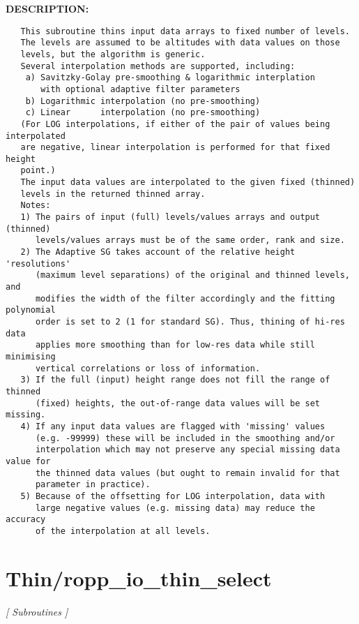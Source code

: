 \textbf{DESCRIPTION:}\hspace{0.08in}\begin{Verbatim}
   This subroutine thins input data arrays to fixed number of levels.
   The levels are assumed to be altitudes with data values on those
   levels, but the algorithm is generic.
   Several interpolation methods are supported, including:
    a) Savitzky-Golay pre-smoothing & logarithmic interplation
       with optional adaptive filter parameters
    b) Logarithmic interpolation (no pre-smoothing)
    c) Linear      interpolation (no pre-smoothing)
   (For LOG interpolations, if either of the pair of values being interpolated
   are negative, linear interpolation is performed for that fixed height 
   point.)
   The input data values are interpolated to the given fixed (thinned)
   levels in the returned thinned array.
   Notes:
   1) The pairs of input (full) levels/values arrays and output (thinned)
      levels/values arrays must be of the same order, rank and size.
   2) The Adaptive SG takes account of the relative height 'resolutions'
      (maximum level separations) of the original and thinned levels, and
      modifies the width of the filter accordingly and the fitting polynomial
      order is set to 2 (1 for standard SG). Thus, thining of hi-res data
      applies more smoothing than for low-res data while still minimising
      vertical correlations or loss of information.
   3) If the full (input) height range does not fill the range of thinned
      (fixed) heights, the out-of-range data values will be set missing.
   4) If any input data values are flagged with 'missing' values
      (e.g. -99999) these will be included in the smoothing and/or
      interpolation which may not preserve any special missing data value for
      the thinned data values (but ought to remain invalid for that
      parameter in practice).
   5) Because of the offsetting for LOG interpolation, data with
      large negative values (e.g. missing data) may reduce the accuracy
      of the interpolation at all levels.
\end{Verbatim}
\section{Thin/ropp\_io\_thin\_select}
\textsl{[ Subroutines ]}

